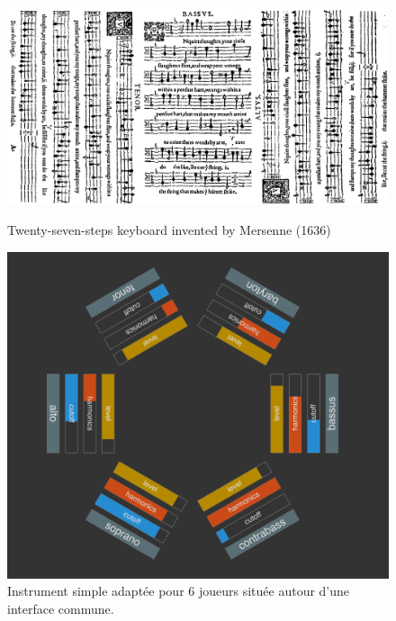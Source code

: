 \begin{figure}
	\captionsetup{format=plain}%
	\centering
	\begin{minipage}[t]{0.48\textwidth}
		\includegraphics[width=\linewidth]{gfx/06_visual_representation/Dowland-firstBookOfSonges.png}
		\caption{Twenty-seven-steps keyboard invented by Mersenne (1636)}
		\label{fig:visual_representation:table_music}
	\end{minipage}
	\hspace{.02\linewidth}
	\begin{minipage}[t]{0.48\textwidth}
	    \includegraphics[width=\linewidth]{gfx/06_visual_representation/mpTUI_multi-orientation.png}
		\caption{Instrument simple adaptée pour 6 joueurs située autour d'une interface commune.}
		\label{fig:visual_representation:multi_orientation}
	\end{minipage}
\end{figure}

